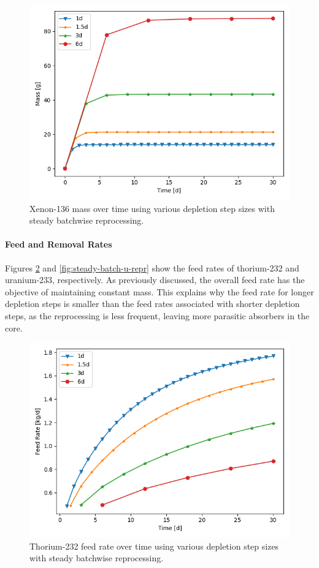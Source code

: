 \begin{figure}[H]
  \centering
  \includegraphics[scale=0.5]{images/Xe136_sp_comp.png}
  \caption{Xenon-136 mass over time using various depletion step sizes with steady batchwise reprocessing.}
   \label{fig:steady-batch-xe136}
\end{figure}

\paragraph{Feed and Removal Rates}

Figures \ref{fig:steady-batch-th-repr} and \ref{fig:steady-batch-u-repr} show the feed rates of thorium-232 and uranium-233, respectively. As previously discussed, the overall feed rate has the objective of maintaining constant mass. This explains why the feed rate for longer depletion steps is smaller than the feed rates associated with shorter depletion steps, as the reprocessing is less frequent, leaving more parasitic absorbers in the core. 

\begin{figure}[H]
  \centering
  \includegraphics[scale=0.5]{images/feed_Th232_6d_sp_comp.png}
  \caption{Thorium-232 feed rate over time using various depletion step sizes with steady batchwise reprocessing.}
   \label{fig:steady-batch-th-repr}
\end{figure}


